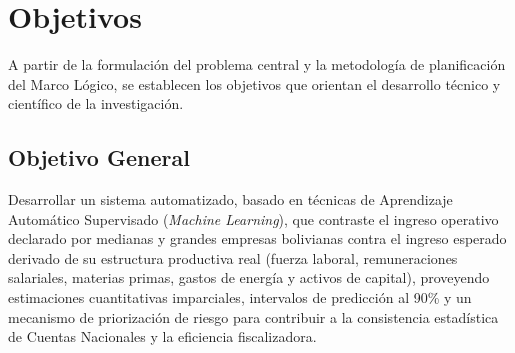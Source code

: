 \section{Objetivos}
\label{sec:objetivos}

A partir de la formulación del problema central y la metodología de planificación del Marco Lógico, se establecen los objetivos que orientan el desarrollo técnico y científico de la investigación.

\subsection{Objetivo General}
Desarrollar un sistema automatizado, basado en técnicas de Aprendizaje Automático Supervisado (\textit{Machine Learning}), que contraste el ingreso operativo declarado por medianas y grandes empresas bolivianas contra el ingreso esperado derivado de su estructura productiva real (fuerza laboral, remuneraciones salariales, materias primas, gastos de energía y activos de capital), proveyendo estimaciones cuantitativas imparciales, intervalos de predicción al 90\% y un mecanismo de priorización de riesgo para contribuir a la consistencia estadística de Cuentas Nacionales y la eficiencia fiscalizadora.

